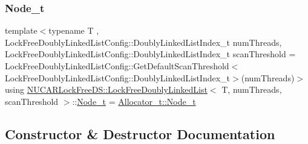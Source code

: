 \subsubsection{\texorpdfstring{Node\+\_\+t}{Node\_t}}
{\footnotesize\ttfamily template$<$typename T , Lock\+Free\+Doubly\+Linked\+List\+Config\+::\+Doubly\+Linked\+List\+Index\+\_\+t num\+Threads, Lock\+Free\+Doubly\+Linked\+List\+Config\+::\+Doubly\+Linked\+List\+Index\+\_\+t scan\+Threshold = Lock\+Free\+Doubly\+Linked\+List\+Config\+::\+Get\+Default\+Scan\+Threshold$<$\+Lock\+Free\+Doubly\+Linked\+List\+Config\+::\+Doubly\+Linked\+List\+Index\+\_\+t$>$(num\+Threads)$>$ \\
using \mbox{\hyperlink{class_n_u_c_a_r_lock_free_d_s_1_1_lock_free_doubly_linked_list}{N\+U\+C\+A\+R\+Lock\+Free\+D\+S\+::\+Lock\+Free\+Doubly\+Linked\+List}}$<$ T, num\+Threads, scan\+Threshold $>$\+::\mbox{\hyperlink{class_n_u_c_a_r_lock_free_d_s_1_1_lock_free_doubly_linked_list_abb8fd1da564d74028552e980bc99a704}{Node\+\_\+t}} =  \mbox{\hyperlink{class_n_u_c_a_r_lock_free_d_s_1_1_allocator_ac44b7846713e20e26a7eede2492fda47}{Allocator\+\_\+t\+::\+Node\+\_\+t}}\hspace{0.3cm}{\ttfamily [private]}}



\subsection{Constructor \& Destructor Documentation}
\mbox{\label{class_n_u_c_a_r_lock_free_d_s_1_1_lock_free_doubly_linked_list_a79b2e6c603e8c7f8f6bb0ca6b9be21f0}} 
